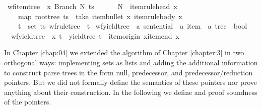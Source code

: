 \begin{isabellebody}
{\isacharbar}{\kern0pt}\ {\isachardoublequoteopen}wf{\isacharunderscore}{\kern0pt}item{\isacharunderscore}{\kern0pt}tree\ {\isasymG}\ x\ {\isacharparenleft}{\kern0pt}Branch\ N\ ts{\isacharparenright}{\kern0pt}\ {\isasymlongleftrightarrow}\ {\isacharparenleft}{\kern0pt}\isanewline
\ \ \ \ N\ {\isacharequal}{\kern0pt}\ item{\isacharunderscore}{\kern0pt}rule{\isacharunderscore}{\kern0pt}head\ x\ {\isasymand}\isanewline
\ \ \ \ map\ root{\isacharunderscore}{\kern0pt}tree\ ts\ {\isacharequal}{\kern0pt}\ take\ {\isacharparenleft}{\kern0pt}item{\isacharunderscore}{\kern0pt}bullet\ x{\isacharparenright}{\kern0pt}\ {\isacharparenleft}{\kern0pt}item{\isacharunderscore}{\kern0pt}rule{\isacharunderscore}{\kern0pt}body\ x{\isacharparenright}{\kern0pt}\ {\isasymand}\isanewline
\ \ \ \ {\isacharparenleft}{\kern0pt}{\isasymforall}t\ {\isasymin}\ set\ ts{\isachardot}{\kern0pt}\ wf{\isacharunderscore}{\kern0pt}rule{\isacharunderscore}{\kern0pt}tree\ {\isasymG}\ t{\isacharparenright}{\kern0pt}{\isacharparenright}{\kern0pt}{\isachardoublequoteclose}\isanewline
\isanewline
{}\isamarkupfalse%
\ wf{\isacharunderscore}{\kern0pt}yield{\isacharunderscore}{\kern0pt}tree\ {\isacharcolon}{\kern0pt}{\isacharcolon}{\kern0pt}\ {\isachardoublequoteopen}{\isacharprime}{\kern0pt}a\ sentential\ {\isasymRightarrow}\ {\isacharprime}{\kern0pt}a\ item\ {\isasymRightarrow}\ {\isacharprime}{\kern0pt}a\ tree\ {\isasymRightarrow}\ bool{\isachardoublequoteclose}\ \isanewline
\ \ {\isachardoublequoteopen}wf{\isacharunderscore}{\kern0pt}yield{\isacharunderscore}{\kern0pt}tree\ {\isasymomega}\ x\ t\ {\isasymequiv}\ yield{\isacharunderscore}{\kern0pt}tree\ t\ {\isacharequal}{\kern0pt}\ {\isasymomega}{\isacharbrackleft}{\kern0pt}item{\isacharunderscore}{\kern0pt}origin\ x{\isachardot}{\kern0pt}{\isachardot}{\kern0pt}item{\isacharunderscore}{\kern0pt}end\ x{\isasymrangle}{\isachardoublequoteclose}%
\isadelimdocument
%
\endisadelimdocument
%
\isatagdocument
%
\isamarkuptrue%
%
\endisatagdocument
{\isafolddocument}%
%
\isadelimdocument
%
\endisadelimdocument
%
\begin{isamarkuptext}%
In Chapter \ref{chap:04} we extended the algorithm of Chapter \ref{chapter:3} in two orthogonal
ways: implementing sets as lists and adding the additional information to construct parse trees
in the form null, predecessor, and predecessor/reduction pointers. But we did not formally define
the semantics of these pointers nor prove anything about their construction. In the following we
define and proof soundness of the pointers.


\end{isamarkuptext}
\end{isabellebody}
